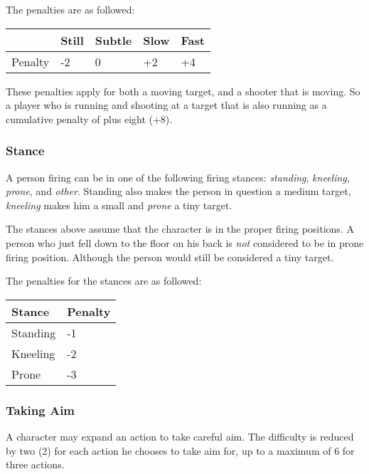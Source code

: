 The penalties are as followed:

\begin{center}
  \begin{tabular}{| l | l | l | l | l |}
    \hline
    \,      & Still & Subtle & Slow & Fast \\ \hline
    Penalty & -2    & 0      & +2   & +4   \\
    \hline
  \end{tabular}
\end{center}

These penalties apply for both a moving target, and a shooter that is moving. So
a player who is running and shooting at a target that is also running as a
cumulative penalty of plus eight (+8).

\subsubsection{Stance}

A person firing can be in one of the following firing stances: \emph{standing},
\emph{kneeling}, \emph{prone}, and \emph{other}. Standing also makes the person
in question a medium target, \emph{kneeling} makes him a small and \emph{prone}
a tiny target.

The stances above assume that the character is in the proper firing positions.
A person who just fell down to the floor on his back is \emph{not} considered to
be in prone firing position. Although the person would still be considered a
tiny target.

The penalties for the stances are as followed:

\begin{center}
  \begin{tabular}{| l | l |}
    \hline
    Stance   & Penalty \\ \hline
    Standing & -1      \\ \hline
    Kneeling & -2      \\ \hline
    Prone    & -3      \\
    \hline
  \end{tabular}
\end{center}

\subsubsection{Taking Aim}

A character may expand an action to take careful aim. The difficulty is reduced
by two (2) for each action he chooses to take aim for, up to a maximum of 6 for
three actions.


